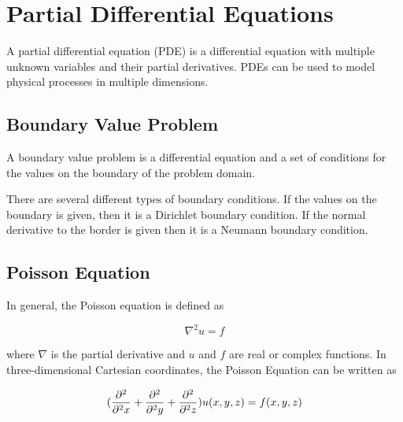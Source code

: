 \section{Partial Differential Equations}

A partial differential equation (PDE) is a differential equation with multiple 
unknown variables and their partial derivatives. PDEs can be used to model physical 
processes in multiple dimensions. 

\subsection{Boundary Value Problem}

A boundary value problem is a differential equation and a set of conditions for the values on the boundary of the problem domain. 

There are several different types of boundary conditions. If the values on the boundary is given, then it is a Dirichlet boundary condition. If the normal derivative to the border is given then it is a Neumann boundary condition\cite{Kreyszig}.

\subsection{Poisson Equation}

In general, the Poisson equation is defined as 

$$\nabla^2 u = f$$

where $\nabla$ is the partial derivative and $u$ and $f$ are real or complex 
functions. In three-dimensional Cartesian coordinates, the Poisson Equation can 
be written as 

$$(\frac{\partial^2}{\partial^2 x} + \frac{\partial^2}{\partial^2 y} + \frac{\partial^2}{\partial^2 z}) u (x, y, z) = f(x, y, z)$$

